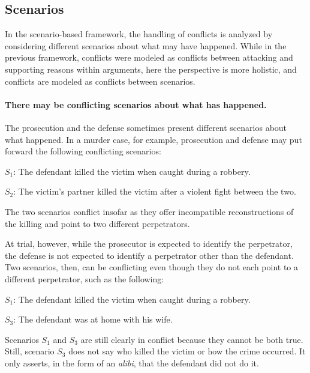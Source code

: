 \documentclass[10pt]{article}
\begin{document}
\subsection{Scenarios}

In the scenario-based framework, the handling of conflicts 
is analyzed by considering different scenarios about what may have happened. While in the previous framework, conflicts were 
modeled as conflicts between attacking and supporting reasons within arguments, 
here the perspective is more holistic, and conflicts 
are modeled as conflicts between scenarios.

 \paragraph{There may be conflicting scenarios about what has happened.} 
The prosecution and the defense sometimes present different scenarios 
about what happened. In a murder case, for example, prosecution and defense 
may put forward the following conflicting scenarios:
%
\begin{description}
	\item $S_1$: The defendant killed the victim when caught during a robbery.
	\item $S_2$: The victim's partner killed the victim after a violent fight between the two.
\end{description}
%
The two scenarios conflict insofar as they offer 
incompatible reconstructions of the killing 
and point to two different perpetrators.

At trial, however, while the prosecutor is expected to identify the perpetrator, the defense is not expected 
to identify a perpetrator other than the defendant. Two scenarios, then, can be conflicting 
even though they do not each point to a different perpetrator, such as the following:
%
\begin{description}
	\item $S_1$: The defendant killed the victim when caught during a robbery.
	\item $S_3$: The defendant was at home with his wife.	
\end{description}
%
Scenarios $S_1$ and $S_3$ are still clearly in conflict because they cannot be both true. 
Still, scenario $S_3$ does not say who killed the victim or how the crime occurred. 
It only asserts, in the form of an \textit{alibi}, that the defendant did not do it.
\end{document}
